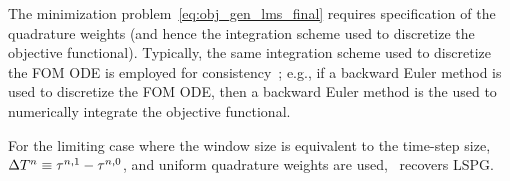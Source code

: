 The minimization problem~\eqref{eq:obj_gen_lms_final} requires specification of the quadrature weights (and hence the integration scheme used to discretize 
the objective functional). Typically, the same integration scheme used to discretize the FOM ODE is employed for consistency~\cite{colloc_review}; e.g., if a  
backward Euler method is used to discretize the FOM ODE, then a backward Euler method is the used to numerically integrate the objective functional.

\begin{remark}
For the limiting case where the window size is equivalent to the time-step size, $\Delta T^{n} \equiv \tau^{n,1} - \tau^{n,0}$, and uniform 
quadrature weights are used, \methodAcronym\ recovers LSPG.
\end{remark} 
